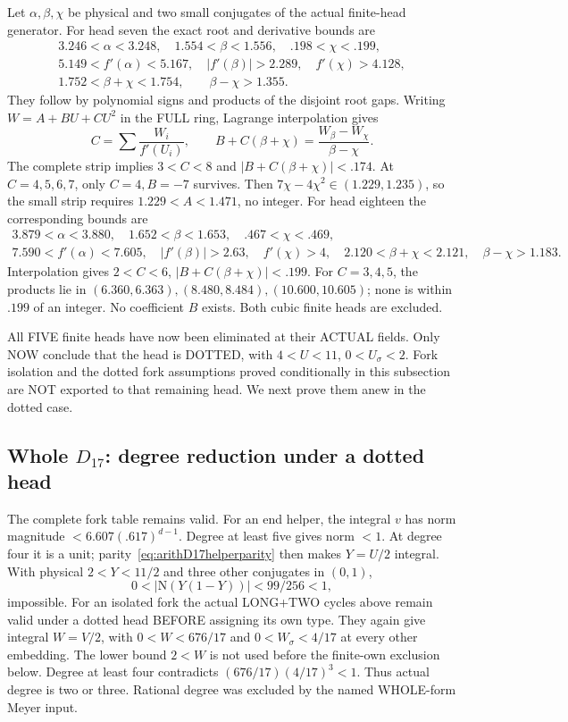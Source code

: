 \documentclass[11pt]{article}
\begin{document}
Let \(\alpha,\beta,\chi\) be physical and two
small conjugates of the actual finite-head generator.
For head seven the exact root and derivative
bounds are
\[
 \begin{gathered}
3.246<\alpha<3.248,\quad1.554<\beta<1.556,\quad
 .198<\chi<.199,\\
5.149<f'(\alpha)<5.167,\quad|f'(\beta)|>2.289,\quad
 f'(\chi)>4.128,\\
1.752<\beta+\chi<1.754,\qquad\beta-\chi>1.355 .
 \end{gathered}
\]
They follow by polynomial signs and products
of the disjoint root gaps.
Writing \(W=A+BU+CU^2\) in the FULL ring,
Lagrange interpolation gives
\[
 C=\sum {\frac{W_i}{f'(U_i)}},\qquad
 B+C(\beta+\chi)={\frac{W_\beta-W_\chi}{\beta-\chi}}.
\tag{D17L}\label{eq:arithD17interpolation}
\]
The complete strip implies \(3<C<8\) and
\(|B+C(\beta+\chi)|<.174\).
At \(C=4,5,6,7\), only \(C=4,B=-7\) survives.
Then \(7\chi-4\chi^2\in(1.229,1.235)\),
so the small strip requires \(1.229<A<1.471\),
no integer.
For head eighteen the corresponding bounds are
\[
 \begin{gathered}
3.879<\alpha<3.880,\quad1.652<\beta<1.653,\quad
 .467<\chi<.469,\\
7.590<f'(\alpha)<7.605,\quad|f'(\beta)|>2.63,\quad
 f'(\chi)>4,\quad
2.120<\beta+\chi<2.121,\quad\beta-\chi>1.183 .
 \end{gathered}
\]
Interpolation gives \(2<C<6\),
\(|B+C(\beta+\chi)|<.199\).
For \(C=3,4,5\), the products lie in
\((6.360,6.363),(8.480,8.484),(10.600,10.605)\);
none is within \(.199\) of an integer.
No coefficient \(B\) exists.
Both cubic finite heads are excluded.

All FIVE finite heads have now been eliminated
at their ACTUAL fields.
Only NOW conclude that the head is DOTTED,
with \(4<U<11\), \(0<U_\sigma<2\).
Fork isolation and the dotted fork assumptions
proved conditionally in this subsection are NOT
exported to that remaining head.
We next prove them anew in the dotted case.

\subsection[Whole D17: degree reduction under a dotted head]{Whole \(D_{17}\): degree reduction under a dotted head}
\label{app:arithD17degrees}

The complete fork table remains valid.
For an end helper, the integral \(v\) has norm
magnitude \(<6.607(.617)^{d-1}\).
Degree at least five gives norm \(<1\).
At degree four it is a unit;
parity~\eqref{eq:arithD17helperparity} then makes
\(Y=U/2\) integral.
With physical \(2<Y<11/2\) and three other
conjugates in \((0,1)\),
\[
                 0<|\mathrm N(Y(1-Y))|<99/256<1,
\]
impossible.
For an isolated fork the actual LONG+TWO
cycles above remain valid under a dotted head
BEFORE assigning its own type.
They again give integral \(W=V/2\), with
\(0<W<676/17\) and \(0<W_\sigma<4/17\)
at every other embedding.
The lower bound \(2<W\) is not used before
the finite-own exclusion below.
Degree at least four contradicts
\((676/17)(4/17)^3<1\).
Thus actual degree is two or three.
Rational degree was excluded by the named
WHOLE-form Meyer input.
\end{document}
